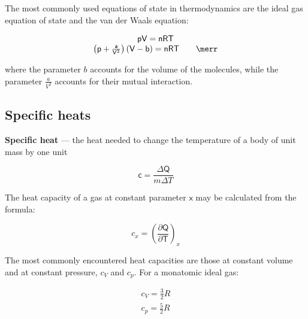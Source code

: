 The most commonly used equations of state in thermodynamics are the ideal gas equation of state and the van der Waals equation:

\begin{equation}
    \begin{matrix}
        \mathsf{pV} = \mathsf{nRT}\\
        \left(\mathsf{p} + \frac{\mathsf{a}}{\mathsf{V}^{2}}\right)\left(\mathsf{V}-\mathsf{b}\right) = \mathsf{nRT} \qquad \merr
    \end{matrix}
\end{equation}

where the parameter $b$ accounts for the volume of the molecules, while the parameter $\frac{a}{V^{2}}$ accounts for their mutual interaction.

\subsection{Specific heats}

\textbf{Specific heat} --- the heat needed to change the temperature of a body of unit mass by one unit

\begin{equation}
    \mathsf{c} = \frac{\Delta \mathsf{Q}}{m\Delta T}
\end{equation}

The heat capacity of a gas at constant parameter $\mathsf{x}$ may be calculated from the formula:

\begin{equation}
    c_{x} = \left(\frac{\partial \mathsf{Q}}{\partial\mathsf{T}}\right)_{x}
\end{equation}

The most commonly encountered heat capacities are those at constant volume and at constant pressure, $c_{V}$ and $c_{p}$. For a monatomic ideal gas:

\begin{equation}
    \begin{matrix}
        c_{V} = \frac{3}{2}R\\
        c_{p} = \frac{5}{2}R
    \end{matrix}
\end{equation}

